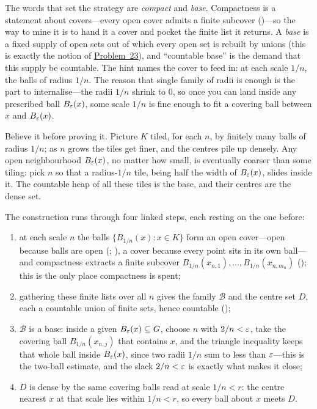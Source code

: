 \documentclass[main.tex]{subfiles}
\begin{document}
\begin{Reflection}
The words that set the strategy are \emph{compact} and \emph{base}. Compactness is a statement about
covers---every open cover admits a finite subcover ()---so the way to mine it is to hand it
a cover and pocket the finite list it returns. A \emph{base} is a fixed supply of open sets out of which
every open set is rebuilt by unions (this is exactly the notion of \hyperlink{prob:23}{Problem~23}), and
``countable base'' is the demand that this supply be countable. The hint names the cover to feed in: at
each scale $1/n$, the balls of radius $1/n$. The reason that single family of radii is enough is the part
to internalise---the radii $1/n$ shrink to $0$, so once you can land inside any prescribed ball
$B_\varepsilon(x)$, some scale $1/n$ is fine enough to fit a covering ball between $x$ and $B_\varepsilon(x)$.

Believe it before proving it. Picture $K$ tiled, for each $n$, by finitely many balls of radius $1/n$;
as $n$ grows the tiles get finer, and the centres pile up densely. Any open neighbourhood $B_\varepsilon(x)$,
no matter how small, is eventually coarser than some tiling: pick $n$ so that a radius-$1/n$ tile, being
half the width of $B_\varepsilon(x)$, slides inside it. The countable heap of all these tiles is the base, and
their centres are the dense set.

The construction runs through four linked steps, each resting on the one before:
\begin{enumerate}[leftmargin=1.7em,itemsep=3pt,topsep=2pt,label=\textnormal{(\arabic*)}]
  \item at each scale $n$ the balls $\{B_{1/n}(x):x\in K\}$ form an open cover---open because balls are
        open (; ), a cover because every point
        sits in its own ball---and compactness extracts a finite subcover $B_{1/n}(x_{n,1}),\dots,
        B_{1/n}(x_{n,m_n})$ (); this is the only place compactness is spent;
  \item gathering these finite lists over all $n$ gives the family $\mathcal B$ and the centre set $D$,
        each a countable union of finite sets, hence countable ();
  \item $\mathcal B$ is a base: inside a given $B_\varepsilon(x)\subseteq G$, choose $n$ with $2/n<\varepsilon$, take
        the covering ball $B_{1/n}(x_{n,j})$ that contains $x$, and the triangle inequality keeps that
        whole ball inside $B_\varepsilon(x)$, since two radii $1/n$ sum to less than $\varepsilon$---this is the
        two-ball estimate, and the slack $2/n<\varepsilon$ is exactly what makes it close;
  \item $D$ is dense by the same covering balls read at scale $1/n<r$: the centre nearest $x$ at that
        scale lies within $1/n<r$, so every ball about $x$ meets $D$.
\end{enumerate}


\end{Reflection}
\end{document}
